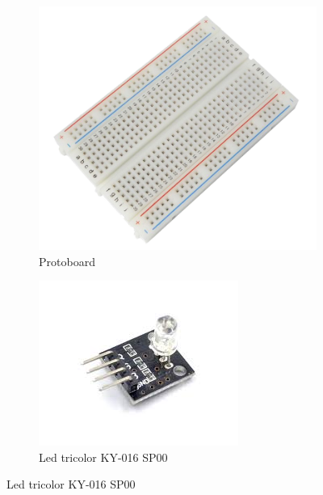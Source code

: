 \documentclass{article}
\begin{document}
\begin{figure}[H]
	\centering
	\begin{subfigure}[b]{0.45\textwidth}
		\includegraphics[width=\textwidth]{../images/protoboard.png}
		\caption*{Protoboard}
		\label{fig:protoboard}
	\end{subfigure}
	\hfill
	\begin{subfigure}[b]{0.45\textwidth}
		\includegraphics[width=\textwidth]{../images/led_tricolor.jpg}
		\caption*{Led tricolor KY-016 SP00}
		\label{fig:led tricolor}
	\end{subfigure}
\end{figure}
\end{document}
